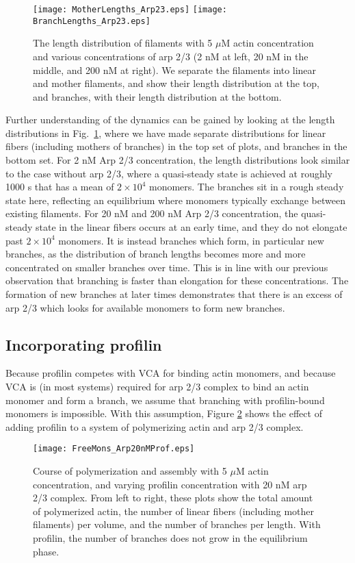 \documentclass[11pt]{article}
\begin{document}
\begin{figure}
\centering
\texttt{[image: MotherLengths\_Arp23.eps]}
\texttt{[image: BranchLengths\_Arp23.eps]}
\caption{\label{fig:LengthDistsArp} The length distribution of filaments with 5 $\mu$M actin concentration and various concentrations of arp 2/3 (2 nM at left, 20 nM in the middle, and 200 nM at right). We separate the filaments into linear and mother filaments, and show their length distribution at the top, and branches, with their length distribution at the bottom. }
\end{figure}

Further understanding of the dynamics can be gained by looking at the length distributions in Fig.\ \ref{fig:LengthDistsArp}, where we have made separate distributions for linear fibers (including mothers of branches) in the top set of plots, and branches in the bottom set. For 2 nM Arp 2/3 concentration, the length distributions look similar to the case without arp 2/3, where a quasi-steady state is achieved at roughly 1000 s that has a mean of $2 \times 10^4$ monomers. The branches sit in a rough steady state here, reflecting an equilibrium where monomers typically exchange between existing filaments. For 20 nM and 200 nM Arp 2/3 concentration, the quasi-steady state in the linear fibers occurs at an early time, and they do not elongate past $2 \times 10^4$ monomers. It is instead branches which form, in particular new branches, as the distribution of branch lengths becomes more and more concentrated on smaller branches over time. This is in line with our previous observation that branching is faster than elongation for these concentrations. The formation of new branches at later times demonstrates that there is an excess of arp 2/3 which looks for available monomers to form new branches. 

\subsection{Incorporating profilin}
Because profilin competes with VCA for binding actin monomers, and because VCA is (in most systems) required for arp 2/3 complex to bind an actin monomer and form a branch, we assume that branching with profilin-bound monomers is impossible. With this assumption, Figure \ref{fig:PolyArp2Prof} shows the effect of adding profilin to a system of polymerizing actin and arp 2/3 complex.

\begin{figure}
\centering
\texttt{[image: FreeMons\_Arp20nMProf.eps]}
\caption{\label{fig:PolyArp2Prof}Course of polymerization and assembly with 5 $\mu$M actin concentration, and varying profilin concentration with 20 nM arp 2/3 complex. From left to right, these plots show the total amount of polymerized actin, the number of linear fibers (including mother filaments) per volume, and the number of branches per length. With profilin, the number of branches does not grow in the equilibrium phase. }
\end{figure}
\end{document}
